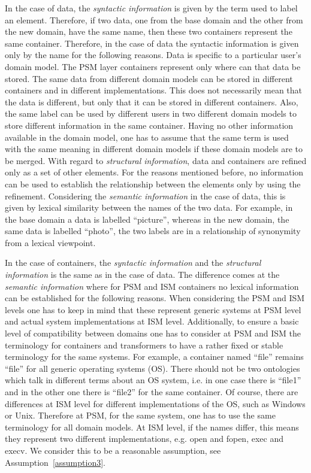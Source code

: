 \documentclass{sig-alternate}
\begin{document}
In the case of data, the \textit{syntactic information} is given by the term used to label an element.
Therefore, if two data, one from the base domain and the other from the new domain,
have the same name, then these two containers represent the same container.
Therefore, in the case of data the syntactic information is given only by the name for the following reasons.
Data is specific to a particular user's domain model. The PSM layer containers represent only where can that data be stored.
The same data from different domain models can be stored in different containers and in different implementations.
This does not necessarily mean that the data is different, but only that it can be stored in different containers.
Also, the same label can be used by different users in two different domain models to store different information in the same container.
Having no other information available in the domain model, one has to assume that the same term is used with the same meaning
in different domain models if these domain models are to be merged.
With regard to \textit{structural information}, data and containers are refined only as a set of other elements.
For the reasons mentioned before, no information can be used to establish the relationship between the elements only by using the refinement.
Considering the \textit{semantic information} in the case of data, this is given by lexical similarity between the names of the two data.
For example, in the base domain a data is labelled ``picture'', whereas in the new domain, the same data is labelled ``photo'', 
the two labels are in a relationship of synonymity from a lexical viewpoint.

In the case of containers, the \textit{syntactic information} and the \textit{structural information} is the same as in the case of data.
The difference comes at the \textit{semantic information} where for PSM and ISM containers no lexical information can be established for the following reasons.
When considering the PSM and ISM levels one has to keep in mind that these represent generic systems at PSM level and actual system implementations at ISM level. 
Additionally, to ensure a basic level of compatibility between domains one has to consider at PSM and ISM the terminology for containers and transformers
to have a rather fixed or stable terminology for the same systems.
For example, a container named ``file'' remains ``file'' for all generic operating systems (OS).
There should not be two ontologies which talk in different terms about an OS system, 
i.e. in one case there is ``file1'' and in the other one there is ``file2'' for the same container.
Of course, there are differences at ISM level for  different implementations of the OS, such as Windows or Unix.
Therefore at PSM, for the same system, one has to use the same terminology for all domain models.
At ISM level, if the names differ, this means they represent two different implementations, e.g. open and fopen, exec and execv.
We consider this to be a reasonable assumption, see Assumption~\ref{assumption3}.
\end{document}
